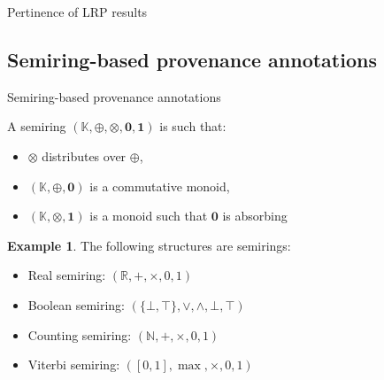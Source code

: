 \documentclass[aspectratio=169]{beamer}
\theoremstyle{definition}
\newtheorem*{exemple}{Example}
\begin{document}
\begin{frame}{Pertinence of LRP results}
    \begin{figure}
        \centering
    \end{figure}
\end{frame}

\subsection{Semiring-based provenance annotations}
\begin{frame}{Semiring-based provenance annotations \cite{green-2007,ramusat-prov}}
    \begin{definition}[Semiring]
        A semiring $(\mathbb{K}, \oplus, \otimes, \mathbf{0}, \mathbf{1})$ is such that:
        \begin{itemize}[label=--, noitemsep]
            \item $\otimes$ distributes over $\oplus$,
            \item $(\mathbb{K}, \oplus, \mathbf{0})$ is a commutative monoid,
            \item $(\mathbb{K}, \otimes, \mathbf{1})$ is a monoid such that $\mathbf{0}$ is absorbing
        \end{itemize}
    \end{definition}

    \begin{exemple}
        The following structures are semirings:
        \begin{itemize}[label=--, noitemsep]
            \item Real semiring: $(\mathbb{R}, +, \times, 0, 1)$
            \item Boolean semiring: $(\{\bot, \top\}, \lor, \land, \bot, \top)$
            \item Counting semiring: $(\mathbb{N}, +, \times, 0, 1)$
            \item Viterbi semiring: $([0, 1], \max, \times, 0, 1)$
        \end{itemize}
    \end{exemple}
\end{frame}
\end{document}
